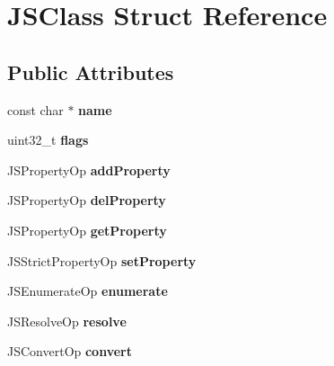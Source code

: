\hypertarget{struct_j_s_class}{\section{J\-S\-Class Struct Reference}
\label{struct_j_s_class}
}
\subsection*{Public Attributes}
\begin{DoxyCompactItemize}
\item 
\hypertarget{struct_j_s_class_a4cfe1375541c99eb01f520c2255e558e}{const char $\ast$ {\bfseries name}}\label{struct_j_s_class_a4cfe1375541c99eb01f520c2255e558e}

\item 
\hypertarget{struct_j_s_class_ab4d77dee4c17a4d417f79f746011ac68}{uint32\-\_\-t {\bfseries flags}}\label{struct_j_s_class_ab4d77dee4c17a4d417f79f746011ac68}

\item 
\hypertarget{struct_j_s_class_a91443a1ec8864cd36414743a50567c53}{J\-S\-Property\-Op {\bfseries add\-Property}}\label{struct_j_s_class_a91443a1ec8864cd36414743a50567c53}

\item 
\hypertarget{struct_j_s_class_a0f09149265c97768afb03dc0cc5b7a3e}{J\-S\-Property\-Op {\bfseries del\-Property}}\label{struct_j_s_class_a0f09149265c97768afb03dc0cc5b7a3e}

\item 
\hypertarget{struct_j_s_class_a9ce84e68ff60f9aa6279e9b80b9ea226}{J\-S\-Property\-Op {\bfseries get\-Property}}\label{struct_j_s_class_a9ce84e68ff60f9aa6279e9b80b9ea226}

\item 
\hypertarget{struct_j_s_class_ac0bcc884237249a9c9949e0b748b9e4c}{J\-S\-Strict\-Property\-Op {\bfseries set\-Property}}\label{struct_j_s_class_ac0bcc884237249a9c9949e0b748b9e4c}

\item 
\hypertarget{struct_j_s_class_a47fa4ef170845c56715884833a86098c}{J\-S\-Enumerate\-Op {\bfseries enumerate}}\label{struct_j_s_class_a47fa4ef170845c56715884833a86098c}

\item 
\hypertarget{struct_j_s_class_a0b673a66c12e52ab63ae5671b707fe80}{J\-S\-Resolve\-Op {\bfseries resolve}}\label{struct_j_s_class_a0b673a66c12e52ab63ae5671b707fe80}

\item 
\hypertarget{struct_j_s_class_a6e1d0a91e83bdcde4127a70bc912fead}{J\-S\-Convert\-Op {\bfseries convert}}\label{struct_j_s_class_a6e1d0a91e83bdcde4127a70bc912fead}


\end{DoxyCompactItemize}
